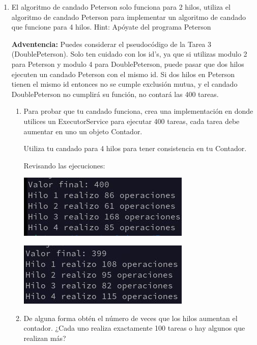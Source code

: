 \begin{enumerate}
    \item El algoritmo de candado Peterson solo funciona para 2 hilos, utiliza el algoritmo de candado Peterson para implementar un algoritmo de candado que funcione para 4 hilos. Hint: Apóyate del programa Peterson

    \textbf{Adventencia:} Puedes considerar el pseudocódigo de la Tarea 3 (DoublePeterson). Solo ten cuidado con los id’s, ya que si utilizas modulo 2 para Peterson y modulo 4 para DoublePeterson, puede pasar que dos hilos ejecuten un candado Peterson con el mismo id. Si dos hilos en Peterson tienen el mismo id entonces no se cumple exclusión mutua, y el candado DoublePeterson no cumplirá su función, no contará las 400 tareas.


    \begin{enumerate}
        \item Para probar que tu candado funciona, crea una implementación en donde utilices un ExecutorService para ejecutar 400 tareas, cada tarea debe aumentar en uno un objeto Contador.
        
        Utiliza tu candado para 4 hilos para tener consistencia en tu Contador.

        Revisando las ejecuciones:

        \begin{center}
            \includegraphics[width = 8 cm]{Images/Practica3_01.jpg}

            \includegraphics[width = 8 cm]{Images/Practica3_02.jpg}
        \end{center}

        \item De alguna forma obtén el número de veces que los hilos aumentan el contador. ¿Cada uno realiza exactamente 100 tareas o hay algunos que realizan más?


\end{enumerate}
\end{enumerate}
